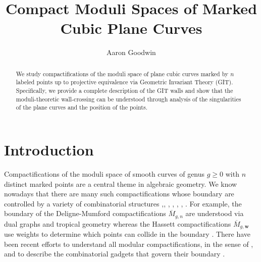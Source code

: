\documentclass{amsart}
\title{
Compact Moduli Spaces of Marked Cubic Plane Curves
}
\author{Aaron Goodwin}
\numberwithin{equation}{section}
\theoremstyle{definition}
\begin{document}
\begin{abstract}
We study compactifications of the moduli space of plane cubic curves marked by \(n\) labeled points up to projective equivalence via Geometric Invariant Theory (GIT). Specifically, we provide a complete description of the GIT walls and show that the moduli-theoretic wall-crossing can be understood through analysis of the singularities of the plane curves and the position of the points.
\end{abstract}


\maketitle

\section{Introduction}\label{sec:intro}
Compactifications of the moduli space of smooth curves of genus $g \geq 0$ with $n$ distinct marked points are a central theme in algebraic geometry. We know nowadays that there are many such compactifications whose boundary are controlled by a variety of combinatorial structures 
\cite{hassett2002modulispacesweightedpointed},\cite{smyth2009classificationmodularcompactificationsmoduli}, \cite{Bozlee_2023}, \cite{pandharipande1995geometricinvarianttheorycompactification},  \cite{Giansiracusa_2010}, 
\cite{Jen13}, \cite{giansiracusa2016gitcompactificationsm0nflips}. For example, the boundary of the Deligne-Mumford compactifications $\overline{M}_{g,n}$ are understood via dual graphs and tropical geometry \cite{caporaso2018recursivecombinatorialaspectscompactified} whereas the Hassett compactifications $\overline{M}_{g, \mathbf{w}}$ use weights to determine which points can collide in the boundary \cite{hassett2002modulispacesweightedpointed}. There have been recent efforts to understand all modular compactifications, in the sense of  \cite{smyth2009classificationmodularcompactificationsmoduli}, and to describe the combinatorial gadgets that govern their boundary \cite{Bozlee_2023}.
\end{document}
